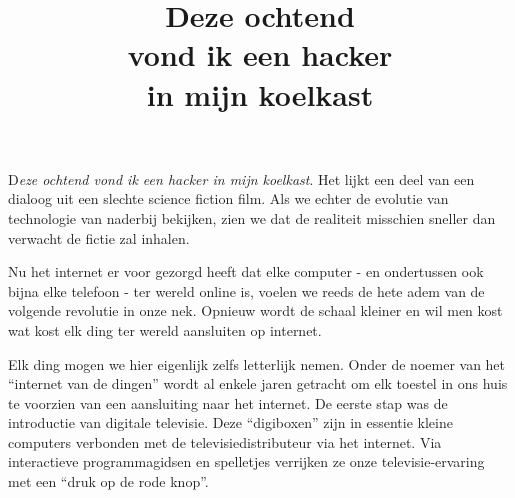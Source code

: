 \documentclass[DIV=calc,paper=a4,fontsize=11pt,twocolumn,draft]{scrartcl}
\title{Deze ochtend\\vond ik een hacker\\in mijn koelkast}
\date{}
\newcommand{\initial}[1]{
\lettrine[lines=4,lhang=0.3,nindent=0em]{
\color{VeryDarkGrey}
{\textsf{#1}}}{}}
\begin{document}

\initial{D}\emph{eze ochtend vond ik een hacker in mijn koelkast}. Het lijkt
een deel van een dialoog uit een slechte science fiction film. Als we echter de
evolutie van technologie van naderbij bekijken, zien we dat de realiteit
misschien sneller dan verwacht de fictie zal inhalen.

Nu het internet er voor gezorgd heeft dat elke computer - en ondertussen ook
bijna elke telefoon - ter wereld online is, voelen we reeds de hete adem van de
volgende revolutie in onze nek. Opnieuw wordt de schaal kleiner en wil men kost
wat kost elk ding ter wereld aansluiten op internet.

Elk ding mogen we hier eigenlijk zelfs letterlijk nemen. Onder de noemer van
het ``internet van de dingen'' wordt al enkele jaren getracht om elk toestel in
ons huis te voorzien van een aansluiting naar het internet. De eerste stap was
de introductie van digitale televisie. Deze ``digiboxen'' zijn in essentie
kleine computers verbonden met de televisiedistributeur via het internet. Via
interactieve programmagidsen en spelletjes verrijken ze onze televisie-ervaring
met een ``druk op de rode knop''.
\end{document}
